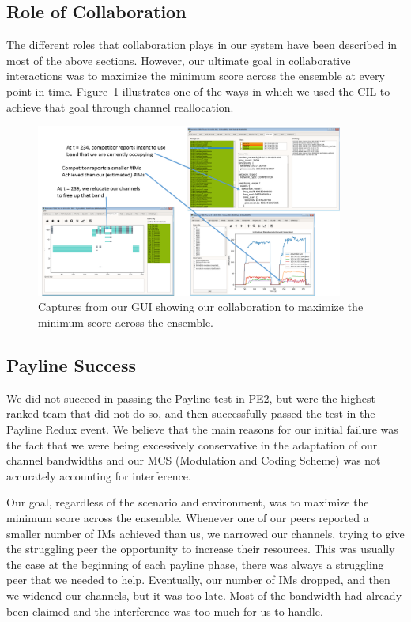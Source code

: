 \documentclass[11pt]{article}
\begin{document}
\subsection{Role of Collaboration}

The different roles that collaboration plays in our system have been described in most of the above sections. However, our ultimate goal in collaborative interactions was to maximize the minimum score across the ensemble at every point in time. Figure~\ref{fg:collab_chanalloc} illustrates one of the ways in which we used the CIL to achieve that goal through channel reallocation.

\begin{figure} [h]
 \centerline{
 \includegraphics[width = 0.9\textwidth]{Figures/Collab_chanalloc.png}}
 \caption{Captures from our GUI showing our collaboration to maximize the minimum score across the ensemble.}
 \label{fg:collab_chanalloc}
 \end{figure}
 
\subsection{Payline Success}

We did not succeed in passing the Payline test in PE2, but were the highest ranked team that did not do so, and then successfully passed the test in the Payline Redux event. We believe that the main reasons for our initial failure was the fact that we were being excessively conservative in the adaptation of our channel bandwidths and our MCS (Modulation and Coding Scheme) was not accurately accounting for interference.

Our goal, regardless of the scenario and environment, was to maximize the minimum score across the ensemble. Whenever one of our peers reported a smaller number of IMs achieved than us, we narrowed our channels, trying to give the struggling peer the opportunity to increase their resources. This was usually the case at the beginning of each payline phase, there was always a struggling peer that we needed to help. Eventually, our number of IMs dropped, and then we widened our channels, but it was too late. Most of the bandwidth had already been claimed and the interference was too much for us to handle.
\end{document}
